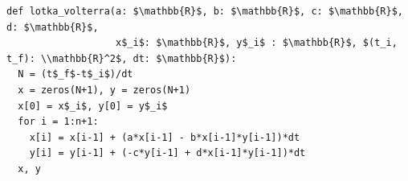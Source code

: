 \documentclass[border=10pt]{standalone}
\begin{document}
\begin{lstlisting}
def lotka_volterra(a: $\mathbb{R}$, b: $\mathbb{R}$, c: $\mathbb{R}$, d: $\mathbb{R}$,
                   x$_i$: $\mathbb{R}$, y$_i$ : $\mathbb{R}$, $(t_i, t_f): \\mathbb{R}^2$, dt: $\mathbb{R}$):
  N = (t$_f$-t$_i$)/dt
  x = zeros(N+1), y = zeros(N+1)
  x[0] = x$_i$, y[0] = y$_i$
  for i = 1:n+1:
    x[i] = x[i-1] + (a*x[i-1] - b*x[i-1]*y[i-1])*dt
    y[i] = y[i-1] + (-c*y[i-1] + d*x[i-1]*y[i-1])*dt
  x, y
\end{lstlisting}
\end{document}
